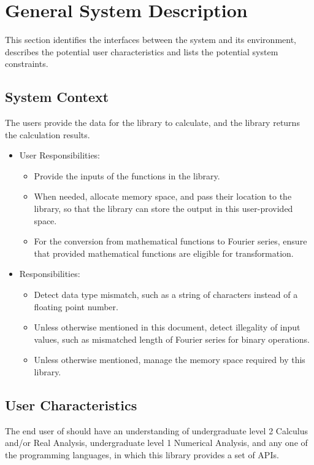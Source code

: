 \documentclass[12pt]{article}
\begin{document}
\section{General System Description}\label{Sc:GSD}

This section identifies the interfaces between the system and its environment,
describes the potential user characteristics and lists the potential system
constraints.


\subsection{System Context}

The users provide the data for the library to  calculate, and the library 
returns the calculation results.
\begin{itemize}
	\item User Responsibilities:
	\begin{itemize}
		\item Provide the inputs of the functions in the library.
		\item When needed, allocate memory space, and pass their location to the library, so that the library can store the output in this user-provided space.
		\item For the conversion from mathematical functions to Fourier series, 
		ensure that provided mathematical functions are eligible for transformation. 
	\end{itemize}
	\item \progname{} Responsibilities:
	\begin{itemize}
		\item Detect data type mismatch, such as a string of characters 
		instead of a floating point number.
		\item Unless otherwise mentioned in this document, detect illegality 
		of input values, such as mismatched length of Fourier series 
		for binary operations.
		\item Unless otherwise mentioned, manage the memory space 
		required by this library.
	\end{itemize}
\end{itemize}

\subsection{User Characteristics} \label{SecUserCharacteristics}

The end user of \progname{} should have an understanding of undergraduate 
level 2 Calculus and/or Real Analysis, undergraduate level 1 Numerical 
Analysis, and any one of the programming languages, in which this library 
provides a set of APIs.
\end{document}
